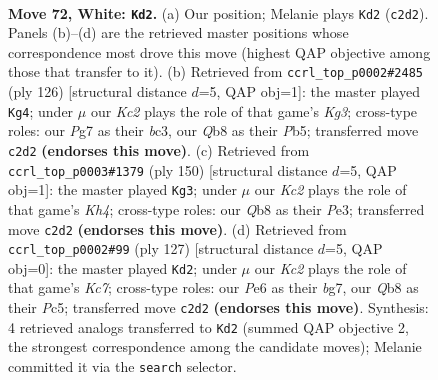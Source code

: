 \documentclass[11pt]{article}
\begin{document}
\clearpage

\begin{figure}[p]\centering
\begin{subfigure}{0.46\textwidth}\centering
\resizebox{\linewidth}{!}{%
\newchessgame
\chessboard[
  setfen={1Q6/6P1/4P3/7P/2k5/8/2K5/8 w - - 1 72},
  showmover=false,
  pgfstyle=straightmove, color=movearrow, markmove={c2-d2}
]}
\caption{}
\end{subfigure}\hfill
\begin{subfigure}{0.46\textwidth}\centering
\resizebox{\linewidth}{!}{%
\newchessgame
\chessboard[
  setfen={8/8/7p/1P5P/8/2b1k1K1/8/8 w - - 17 64},
  showmover=false,
  pgfstyle=straightmove, color=movearrow, markmove={g3-g4}
]}
\caption{}
\end{subfigure}
\\[4pt]
\begin{subfigure}{0.46\textwidth}\centering
\resizebox{\linewidth}{!}{%
\newchessgame
\chessboard[
  setfen={8/7p/8/5k2/7K/4P3/6P1/8 w - - 0 76},
  showmover=false,
  pgfstyle=straightmove, color=movearrow, markmove={h4-g3}
]}
\caption{}
\end{subfigure}\hfill
\begin{subfigure}{0.46\textwidth}\centering
\resizebox{\linewidth}{!}{%
\newchessgame
\chessboard[
  setfen={8/6B1/8/p1p5/4K3/p7/2k5/8 b - - 3 64},
  showmover=false,
  pgfstyle=straightmove, color=movearrow, markmove={c2-d2}
]}
\caption{}
\end{subfigure}
\caption{\textbf{Move 72, White: \texttt{Kd2}.} (a) Our position; Melanie plays \texttt{Kd2} (\texttt{c2d2}). Panels (b)--(d) are the retrieved master positions whose correspondence most drove this move (highest QAP objective among those that transfer to it). (b) Retrieved from \texttt{ccrl\_top\_p0002\#2485} (ply 126) [structural distance $d$=5, QAP obj=1]: the master played \texttt{Kg4}; under $\mu$ our \emph{Kc2} plays the role of that game's \emph{Kg3}; cross-type roles: our \emph{P}g7 as their \emph{b}c3, our \emph{Q}b8 as their \emph{P}b5; transferred move \texttt{c2d2} \textbf{(endorses this move)}. (c) Retrieved from \texttt{ccrl\_top\_p0003\#1379} (ply 150) [structural distance $d$=5, QAP obj=1]: the master played \texttt{Kg3}; under $\mu$ our \emph{Kc2} plays the role of that game's \emph{Kh4}; cross-type roles: our \emph{Q}b8 as their \emph{P}e3; transferred move \texttt{c2d2} \textbf{(endorses this move)}. (d) Retrieved from \texttt{ccrl\_top\_p0002\#99} (ply 127) [structural distance $d$=5, QAP obj=0]: the master played \texttt{Kd2}; under $\mu$ our \emph{Kc2} plays the role of that game's \emph{Kc7}; cross-type roles: our \emph{P}e6 as their \emph{b}g7, our \emph{Q}b8 as their \emph{P}c5; transferred move \texttt{c2d2} \textbf{(endorses this move)}. Synthesis: 4 retrieved analogs transferred to \texttt{Kd2} (summed QAP objective 2, the strongest correspondence among the candidate moves); Melanie committed it via the \texttt{search} selector.}
\label{fig:thought-m142}
\end{figure}
\end{document}

